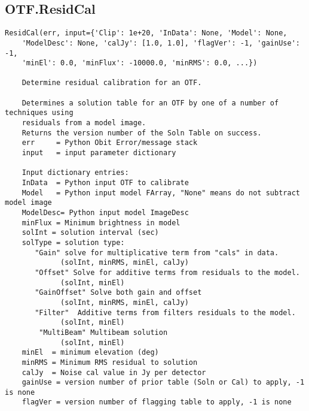 \documentclass[11pt]{report}
\begin{document}
\subsection{OTF.ResidCal}
\begin{verbatim}
ResidCal(err, input={'Clip': 1e+20, 'InData': None, 'Model': None, 
    'ModelDesc': None, 'calJy': [1.0, 1.0], 'flagVer': -1, 'gainUse': -1, 
    'minEl': 0.0, 'minFlux': -10000.0, 'minRMS': 0.0, ...})

    Determine residual calibration for an OTF.
    
    Determines a solution table for an OTF by one of a number of techniques using
    residuals from a model image.
    Returns the version number of the Soln Table on success.
    err     = Python Obit Error/message stack
    input   = input parameter dictionary
    
    Input dictionary entries:
    InData  = Python input OTF to calibrate
    Model   = Python input model FArray, "None" means do not subtract model image
    ModelDesc= Python input model ImageDesc
    minFlux = Minimum brightness in model
    solInt = solution interval (sec)
    solType = solution type:
       "Gain" solve for multiplicative term from "cals" in data.
             (solInt, minRMS, minEl, calJy)
       "Offset" Solve for additive terms from residuals to the model.
             (solInt, minEl)
       "GainOffset" Solve both gain and offset
             (solInt, minRMS, minEl, calJy)
       "Filter"  Additive terms from filters residuals to the model.
             (solInt, minEl)
        "MultiBeam" Multibeam solution
             (solInt, minEl)
    minEl  = minimum elevation (deg)
    minRMS = Minimum RMS residual to solution
    calJy  = Noise cal value in Jy per detector 
    gainUse = version number of prior table (Soln or Cal) to apply, -1 is none
    flagVer = version number of flagging table to apply, -1 is none
\end{verbatim}
\end{document}
